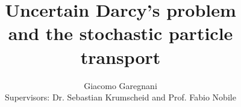 \documentclass{article}
\title{Uncertain Darcy's problem \\ and the stochastic particle transport}
\author{Giacomo Garegnani \\ {Supervisors: Dr. Sebastian Krumscheid and Prof. Fabio Nobile}}
\date{}
\begin{document}


\clearpage
\thispagestyle{empty}
\tableofcontents

\clearpage
{}
\setcounter{page}{1}






\clearpage
\begin{appendices}

\end{appendices}

\clearpage


\end{document}
